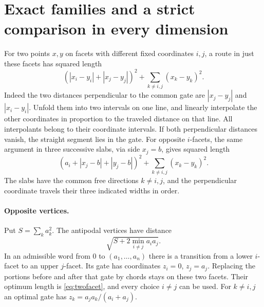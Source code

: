 \documentclass[10pt,letterpaper]{article}
\begin{document}
\section{Exact families and a strict comparison in every dimension}
\label{sec:families}
For two points $x,y$ on facets with different fixed coordinates
$i,j$, a route in just these facets has squared length
\begin{equation}\label{eq:twofacet}
       (|x_i-y_i|+|x_j-y_j|)^2+
                       \sum_{k\ne i,j}(x_k-y_k)^2 .
\end{equation}
Indeed the two distances perpendicular to the common gate are
$|x_j-y_j|$ and $|x_i-y_i|$. Unfold them into two intervals on one
line, and linearly interpolate the other coordinates in proportion
to the traveled distance on that line. All interpolants belong to
their coordinate intervals. If both perpendicular distances vanish,
the straight segment lies in the gate. For opposite $i$-facets,
the same argument in three successive slabs, via side $x_j=b$, gives
squared length
\begin{equation}\label{eq:threefacet}
        (a_i+|x_j-b|+|y_j-b|)^2+
                     \sum_{k\ne i,j}(x_k-y_k)^2 .
\end{equation}
The slabs have the common free directions $k\ne i,j$, and the
perpendicular coordinate travels their three indicated widths in order.

\paragraph{Opposite vertices.}
Put $S=\sum_k a_k^2$. The antipodal vertices have distance
\[
                  \sqrt{S+2\min_{i\ne j}a_i a_j}.
\]
In an admissible word from $0$ to $(a_1,\ldots,a_n)$ there is a
transition from a lower $i$-facet to an upper $j$-facet. Its gate
has coordinates $z_i=0$, $z_j=a_j$. Replacing the portions before
and after that gate by chords stays on these two facets. Their
optimum length is \eqref{eq:twofacet}, and every choice $i\ne j$
can be used. For $k\ne i,j$ an optimal gate has
$z_k=a_j a_k/(a_i+a_j)$.
\end{document}
